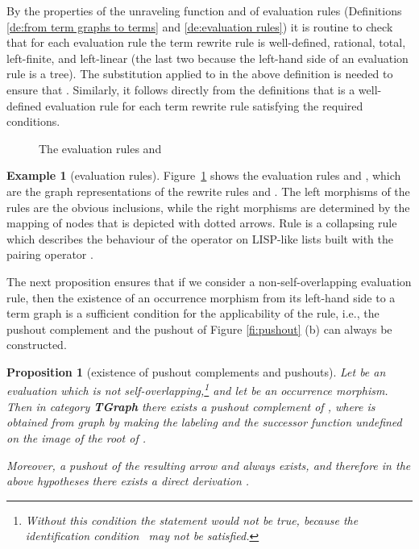 \documentclass{eptcs}
\theoremstyle{plain}
\newtheorem{proposition}[theorem]{Proposition}
\theoremstyle{definition}
\newtheorem{example}[theorem]{Example}
\begin{document}
By the properties of the unraveling function and of evaluation rules 
(Definitions 
\ref{de:from term graphs to terms} and \ref{de:evaluation rules})
it is routine to check that for each 
evaluation rule  the term rewrite rule  is 
well-defined,
rational, total, left-finite, and left-linear (the last two because 
the left-hand side of an evaluation rule is a tree). The substitution 
 applied to  in the above 
definition is needed to ensure that .
Similarly, it follows directly from the definitions that  
is 
a well-defined evaluation rule for each term rewrite rule  
satisfying the 
required conditions.

\begin{figure}[t]


\caption{The evaluation rules  and }
  \protect\label{fi:evaluationRules}
\end{figure}

\begin{example}[evaluation rules]
\label{ex:rules}
Figure~\ref{fi:evaluationRules} shows the evaluation rules  and , which are the graph
representations of the rewrite rules  and
. The left morphisms of the rules are
the obvious inclusions, while the right morphisms are determined by
the mapping of nodes that is depicted with dotted arrows.
Rule  is a collapsing rule which
describes the behaviour of the  operator on {\sc LISP}-like lists
built with the pairing operator .
\end{example}

The next proposition ensures that if we consider a 
non-self-overlapping  evaluation rule, then 
the existence of an occurrence morphism from its 
left-hand side to a term graph is a sufficient condition for the 
applicability of the rule, i.e., the pushout complement and the 
pushout 
of Figure \ref{fi:pushout} (b) can always be constructed.

\begin{proposition}
[existence of pushout complements and pushouts]
\label{pr:po-poc}
Let  be an evaluation which is not 
self-overlapping,\footnote{Without this condition the statement would 
not be true, because the {\em identification condition}~\cite{Ehr:TIAA} 
may not be satisfied.} and let  be an occurrence morphism. Then in category {\bf 
TGraph}
there exists a pushout complement 
 of , where  is 
obtained from graph  by making the labeling and the successor 
function 
undefined on the image of the root of . 

Moreover, a pushout  of the resulting arrow  and  
always exists, and therefore in the above hypotheses there exists a 
direct derivation .
\end{proposition}
\end{document}
